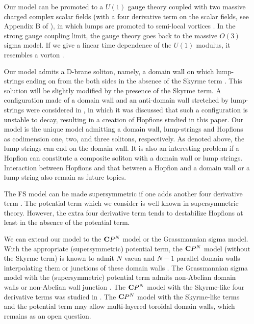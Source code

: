 \documentclass[aps,prd,preprint,
superscriptaddress]{revtex4}
\newcommand {\1}[1]{\frac{1}{#1}}
\newcommand {\2}[1]{\frac{i}{#1}}
\begin{document}
Our model can be promoted to a $U(1)$ gauge theory coupled 
with two massive charged complex scalar fields 
(with a four derivative term on the scalar fields, 
see Appendix B of \cite{Eto:2012qda}), 
in which lumps are promoted to semi-local vortices 
\cite{Vachaspati:1991dz}. 
In the strong gauge coupling limit, the gauge theory goes back 
to the massive $O(3)$ sigma model.
If we give a linear time dependence of the $U(1)$ modulus, 
it resembles a vorton \cite{Radu:2008pp}. 

Our model admits a D-brane soliton, namely, 
a domain wall on which lump-strings ending on from the both sides in the absence of the Skyrme term 
\cite{Gauntlett:2000de,Isozumi:2004vg}. 
This solution will be slightly modified by the presence of the Skyrme term. 
A configuration made of
a domain wall and an anti-domain wall 
stretched by lump-strings were considered 
in \cite{Nitta:2012kk}, in which it was discussed that 
such a configuration is unstable to decay,  
resulting in a creation of Hopfions studied in this paper.
Our model is the unique model admitting a domain wall, 
lump-strings and Hopfions as codimension one, two, and three solitons, respectively.  
As denoted above, the lump strings can end on 
the domain wall. 
It is also an interesting problem if a Hopfion can constitute a composite soliton with a domain wall or lump strings. 
Interaction between Hopfions and that between 
a Hopfion and a domain wall or a lump string 
also remain as future topics. 


The FS model can be made supersymmetric 
if one adds another four derivative term 
\cite{Bergshoeff:1984wb,Eto:2012qda}.  
The potential term which we consider is well known 
in supersymmetric theory. 
However, the extra four derivative term tends to destabilize Hopfions at least in the absence of the potential term. 


We can extend our model to the ${\bf C}P^N$ model or 
the Grassmannian sigma model.
With the appropriate (supersymmetric) potential term, 
the ${\bf C}P^N$ model (without the Skyrme term) is known to 
admit $N$ vacua and 
$N-1$ parallel domain walls interpolating them \cite{Gauntlett:2000ib}  
or junctions of these domain walls \cite{Eto:2005cp}.  
The Grassmannian sigma model 
with the (supersymmetric) potential term \cite{Arai:2003tc} 
admits non-Abelian domain walls \cite{Isozumi:2004jc} 
or non-Abelian wall junction \cite{Eto:2005fm}.
The ${\bf C}P^N$ model with the Skyrme-like four derivative terms was studied in \cite{Ferreira:2008nn}.  
The ${\bf C}P^N$ model with the Skyrme-like terms and the potential term may allow multi-layered toroidal domain walls, 
which remains as an open question. 
\end{document}
